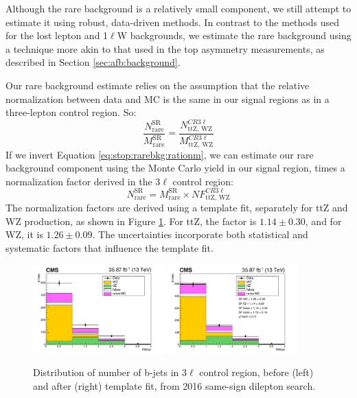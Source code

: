 Although the rare background is a relatively small component, we still
attempt to estimate it using robust, data-driven methods. In contrast
to the methods used for the lost lepton and 1$\ell$W backgrounds, we
estimate the rare background using a technique more akin to that used
in the top asymmetry measurements, as described in Section
\ref{sec:afb:background}.

Our rare background estimate relies on the assumption that the relative
normalization between data and MC is the same in our signal regions as
in a three-lepton control region. So:
\begin{equation}
\label{eq:stop:rarebkg:rationm}
\frac{N_\text{rare}^\text{SR}}{M_\text{rare}^\text{SR}} =
\frac{N_\text{ttZ, WZ}^{CR3\ell}}{M_\text{ttZ, WZ}^{CR3\ell}}
\end{equation}
If we invert Equation \ref{eq:stop:rarebkg:rationm}, we can estimate
our rare background component using the Monte Carlo yield in our
signal region, times a normalization factor derived in the 3$\ell$
control region:
\begin{equation}
\label{eq:stop:rarebkg:estimation}
N_\text{rare}^\text{SR} = M_\text{rare}^\text{SR} \times
NF_\text{ttZ, WZ}^{CR 3\ell}
\end{equation}
The normalization factors are derived using a template fit, separately
for ttZ and WZ production, as shown in Figure
\ref{fig:stop:rarebkg:normalization}. For ttZ, the factor is $1.14 \pm
0.30$, and for WZ, it is $1.26 \pm 0.09$. The uncertainties
incorporate both statistical and systematic factors that influence the
template fit.

\begin{figure}[htb]
\centering
\includegraphics[width=0.45\textwidth]{figures/rarebkg_norm_prefit.pdf}
\includegraphics[width=0.45\textwidth]{figures/rarebkg_norm_postfit.pdf}
\caption{Distribution of number of b-jets in 3$\ell$ control region,
  before (left) and after (right) template fit, from 2016 same-sign dilepton search.}
\label{fig:stop:rarebkg:normalization}
\end{figure}

